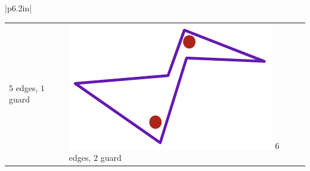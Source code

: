 \documentclass{book}
\newcommand{\hOne}{%
   \color{Black}%
   \fontsize{14}{16}\selectfont%
}
\newenvironment{myClosureOne}[2][.]{%
   \color{#1}%
   \begin{tabular}{|p{#2in}|} \hline \\%
}{%
   \\ \hline \end{tabular}%
}
\newcommand{\retTwo}{\hfill\bigbreak}
\begin{document}
\begin{myClosureOne}{6.2}
{\begin{tabular}{p{1.4in} p{1.4in} p{1.4in} p{1.4in}}
{      $5$ edges,
      $1$ guard \par} &
      {\centering\includegraphics[scale=0.6]{art_gallery_4.png} \newline
      $6$ edges,
      $2$ guard \par} \\
   \end{tabular}\par}
\end{myClosureOne}

\retTwo
\hOne
\end{document}
